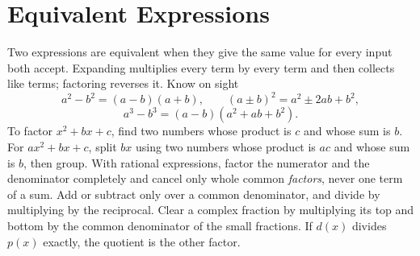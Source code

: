 \chapter{Equivalent Expressions}

\begin{essentials}
Two expressions are equivalent when they give the same value for every input
both accept. Expanding multiplies every term by every term and then collects
like terms; factoring reverses it. Know on sight
\[ a^2-b^2=(a-b)(a+b),\qquad (a\pm b)^2=a^2\pm 2ab+b^2, \]
\[ a^3-b^3=(a-b)(a^2+ab+b^2). \]
To factor $x^2+bx+c$, find two numbers whose product is $c$ and whose sum is
$b$. For $ax^2+bx+c$, split $bx$ using two numbers whose product is $ac$ and
whose sum is $b$, then group. With rational expressions, factor the numerator
and the denominator completely and cancel only whole common \emph{factors},
never one term of a sum. Add or subtract only over a common denominator, and
divide by multiplying by the reciprocal. Clear a complex fraction by
multiplying its top and bottom by the common denominator of the small
fractions. If $d(x)$ divides $p(x)$ exactly, the quotient is the other factor.
\end{essentials}

